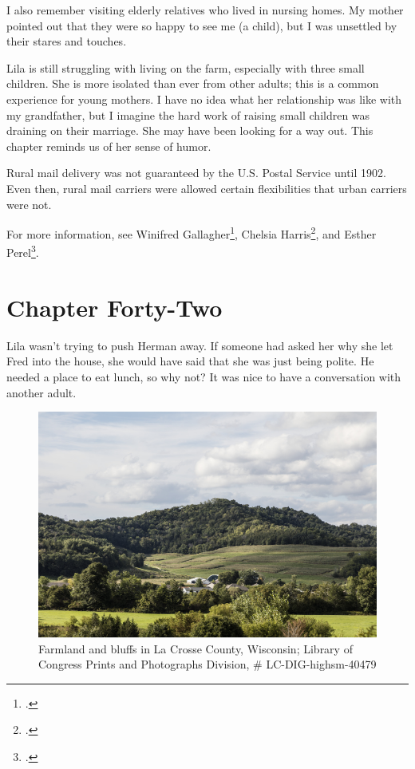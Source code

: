 \documentclass[
  letterpaper,
]{book}
\begin{document}
I also remember visiting elderly relatives who lived in nursing homes.
My mother pointed out that they were so happy to see me (a child), but I
was unsettled by their stares and touches.

Lila is still struggling with living on the farm, especially with three
small children. She is more isolated than ever from other adults; this
is a common experience for young mothers. I have no idea what her
relationship was like with my grandfather, but I imagine the hard work
of raising small children was draining on their marriage. She may have
been looking for a way out. This chapter reminds us of her sense of
humor.

Rural mail delivery was not guaranteed by the U.S. Postal Service until
1902. Even then, rural mail carriers were allowed certain flexibilities
that urban carriers were not.

For more information, see Winifred Gallagher\footnote{.}, Chelsia Harris\footnote{.}, and Esther Perel\footnote{.}.


\chapter{Chapter Forty-Two}\label{chapter-forty-two}

Lila wasn't trying to push Herman away. If someone had asked her why she
let Fred into the house, she would have said that she was just being
polite. He needed a place to eat lunch, so why not? It was nice to have
a conversation with another adult.

\begin{figure}[H]

{\centering \includegraphics[width=0.85\linewidth,height=\textheight,keepaspectratio]{images/Akou23.jpg}

}

\caption[Farmland and bluffs in La Crosse County, Wisconsin]{Farmland
and bluffs in La Crosse County, Wisconsin; Library of Congress Prints
and Photographs Division, \# LC-DIG-highsm-40479}

\end{figure}%
\end{document}
